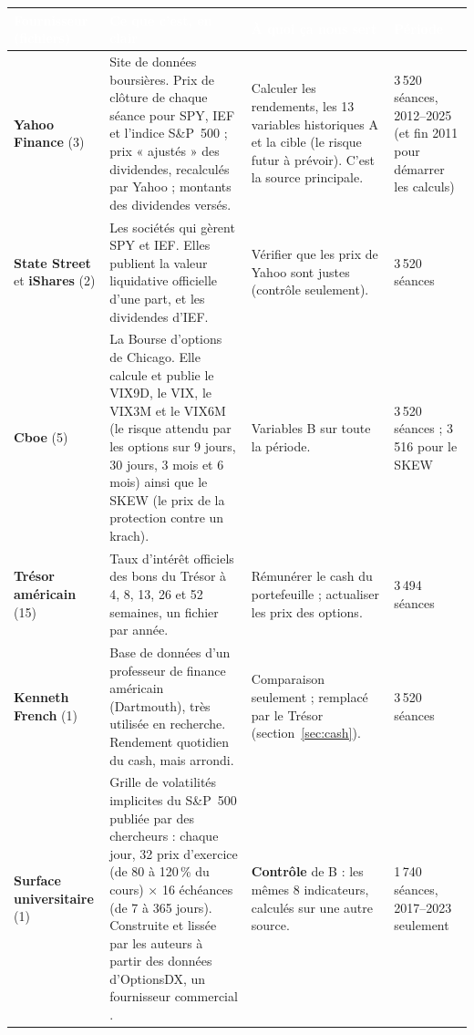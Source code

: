\documentclass[10pt,a4paper]{article}
\newcommand{\entete}[1]{\textcolor{white}{\bfseries #1}}
\begin{document}
{\small
\begin{longtable}{@{}L{2.75cm} L{6.15cm} L{4.6cm} L{2.5cm}@{}}
\entete{Fournisseur (fichiers)} & \entete{Ce que c'est, en clair} & \entete{À quoi ça nous sert} & \entete{Période} \\
\endhead
\textbf{Yahoo Finance} \cite{yahoo} (3) & Site de données boursières. Prix de clôture de chaque séance pour SPY, IEF et l'indice S\&P~500 ; prix « ajustés » des dividendes, recalculés par Yahoo ; montants des dividendes versés. & Calculer les rendements, les 13 variables historiques A et la cible (le risque futur à prévoir). C'est la source principale. & 3\,520 séances, 2012–2025 (et fin 2011 pour démarrer les calculs) \\
\textbf{State Street} et \textbf{iShares} \cite{ssga,ishares} (2) & Les sociétés qui gèrent SPY et IEF. Elles publient la valeur liquidative officielle d'une part, et les dividendes d'IEF. & Vérifier que les prix de Yahoo sont justes (contrôle seulement). & 3\,520 séances \\
\textbf{Cboe} \cite{cboevix,cboeskew} (5) & La Bourse d'options de Chicago. Elle calcule et publie le VIX9D, le VIX, le VIX3M et le VIX6M (le risque attendu par les options sur 9 jours, 30 jours, 3 mois et 6 mois) ainsi que le SKEW (le prix de la protection contre un krach). & Variables B sur toute la période. & 3\,520 séances ; 3\,516 pour le SKEW \\
\textbf{Trésor américain} \cite{treasury} (15) & Taux d'intérêt officiels des bons du Trésor à 4, 8, 13, 26 et 52 semaines, un fichier par année. & Rémunérer le cash du portefeuille ; actualiser les prix des options. & 3\,494 séances \\
\textbf{Kenneth French} \cite{french} (1) & Base de données d'un professeur de finance américain (Dartmouth), très utilisée en recherche. Rendement quotidien du cash, mais arrondi. & Comparaison seulement ; remplacé par le Trésor (section~\ref{sec:cash}). & 3\,520 séances \\
\textbf{Surface universitaire} \cite{dusbaja} (1) & Grille de volatilités implicites du S\&P~500 publiée par des chercheurs : chaque jour, 32 prix d'exercice (de 80 à 120\,\% du cours) × 16 échéances (de 7 à 365 jours). Construite et lissée par les auteurs à partir des données d'OptionsDX, un fournisseur commercial \cite{optionsdx}. & \textbf{Contrôle} de B : les mêmes 8 indicateurs, calculés sur une autre source. & 1\,740 séances, 2017–2023 seulement \\

\end{longtable}}
\end{document}
